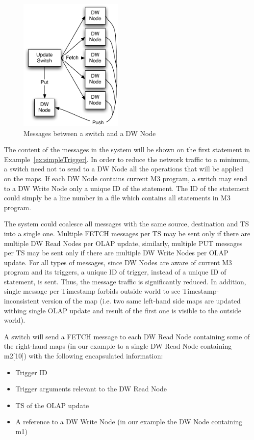 \documentclass{sig-semester}
\def\OLAP{OLAP\xspace}
\def\M3{M3\xspace}
\begin{document}
\begin{figure}
\begin{center}
\includegraphics[width=2in]{UpdateStep.pdf}
\vspace{-3mm}
\caption{Messages between a switch and a DW Node}
\label{fig:msgs}
\vspace{-2mm}
\end{center}
\end{figure}

The content of the messages in the system will be shown on the first statement in Example~\ref{ex:simpleTrigger}. In order to reduce the network traffic to a minimum, a switch need not to send to a DW Node all the operations that will be applied on the maps. If each DW Node contains current \M3 program, a switch may send to a DW Write Node only a unique ID of the statement. The ID of the statement could simply be a line number in a file which contains all statements in \M3 program.

The system could coalesce all messages with the same source, destination and TS into a single one. Multiple FETCH messages per TS may be sent only if there are multiple DW Read Nodes per \OLAP update, similarly, multiple PUT messages per TS may be sent only if there are multiple DW Write Nodes per \OLAP update. For all types of messages, since DW Nodes are aware of current \M3 program and its triggers, a unique ID of trigger, instead of a unique ID of statement, is sent. Thus, the message traffic is significantly reduced. In addition, single message per Timestamp forbids outside world to see Timestamp-inconsistent version of the map (i.e. two same left-hand side maps are updated withing single \OLAP update and result of the first one is visible to the outside world).

A switch will send a FETCH message to each DW Read Node containing some of the right-hand maps (in our example to a single DW Read Node containing m2[10]) with the following encapsulated information:
\begin{itemize}
 \item Trigger ID
 \item Trigger arguments relevant to the DW Read Node
 \item TS of the \OLAP update
 \item A reference to a DW Write Node (in our example the DW Node containing m1)
\end{itemize}
\end{document}
